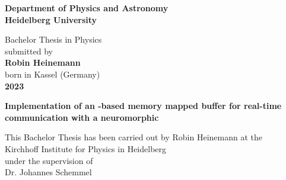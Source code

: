 \begin{titlepage}
\begin{center}
 
\Large\textbf{Department of Physics and Astronomy\\
Heidelberg University}

\vspace{18cm}

\normalsize
Bachelor Thesis in Physics\\
submitted by\\
\vspace{0.5cm}
\Large\textbf{Robin Heinemann}\\
\normalsize
\vspace{0.5cm}
born in Kassel (Germany)\\
\vspace{0.5cm}
\Large\textbf{2023}
\normalsize

\newpage




\Large\textbf{Implementation of an \FPGA{}-based memory mapped buffer for real-time communication with a neuromorphic \ASIC{}}

\vspace{18cm}

\normalsize
This Bachelor Thesis has been carried out by Robin Heinemann at the\\
Kirchhoff Institute for Physics in Heidelberg\\
under the supervision of\\
Dr. Johannes Schemmel

\vfill
\end{center}

\end{titlepage}
